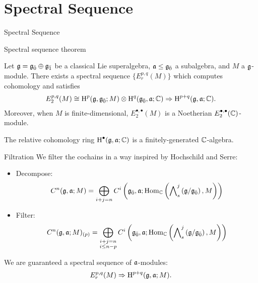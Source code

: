\documentclass{beamer}
\newcommand{\sectionframe}[1]{\begin{frame}\begin{center}{\Huge #1 }\end{center}\end{frame}}
\begin{document}
\section{Spectral Sequence}
\sectionframe{Spectral Sequence}

\begin{frame}{Spectral sequence theorem}\pause

  \begin{theorem}
    Let $\mathfrak{g} = {\mathfrak{g}}_{\bar{0}} \oplus {\mathfrak{g}}_{\bar{1}}$ be a classical Lie superalgebra, $\mathfrak{a} \leq {\mathfrak{g}}_{\bar{0}}$ a subalgebra, and $M$ a $\mathfrak{g}$-module. There exists a spectral sequence $\{E_r^{p,q}(M)\}$ which computes cohomology and satisfies
    \begin{align*}
      E_2^{p,q}(M) \cong \operatorname{H}^p(\mathfrak{g},{\mathfrak{g}}_{\bar{0}};M) \otimes \operatorname{H}^q({\mathfrak{g}}_{\bar{0}},\mathfrak{a};\mathbb{C}) \Rightarrow \operatorname{H}^{p+q}(\mathfrak{g},\mathfrak{a};\mathbb{C}).
    \end{align*}
    Moreover, when $M$ is finite-dimensional, $E_2^{\bullet,\bullet}(M)$ is a Noetherian $E_2^{\bullet,\bullet}(\mathbb{C})$-module.
  \end{theorem}
\pause
  \begin{corollary}
    The relative cohomology ring $\operatorname{H}^\bullet(\mathfrak{g},\mathfrak{a};\mathbb{C})$ is a finitely-generated $\mathbb{C}$-algebra.
  \end{corollary}
\end{frame}

\begin{frame}{Filtration}\pause
  We filter the cochains in a way inspired by Hochschild and Serre:\pause
  \begin{itemize}
  \item Decompose:
    \[
      C^n(\mathfrak{g},\mathfrak{a};M) = \bigoplus_{i + j = n} C^i\left({\mathfrak{g}}_{\bar{0}},\mathfrak{a};\operatorname{Hom}_{\mathbb{C}}\left( \bigwedge\nolimits^{j}_s\left(\mathfrak{g}/{\mathfrak{g}}_{\bar{0}}\right),M\right)\right)
    \]\pause
  \item Filter:
    \[
      C^n(\mathfrak{g},\mathfrak{a};M)_{(p)} = \bigoplus_{\substack{i + j = n\\ i \leq n-p}} C^i\left({\mathfrak{g}}_{\bar{0}},\mathfrak{a};\operatorname{Hom}_{\mathbb{C}}\left( \bigwedge\nolimits^{j}_s\left(\mathfrak{g}/{\mathfrak{g}}_{\bar{0}}\right),M\right)\right)
    \]
    
  \end{itemize}
\pause
  We are guaranteed a spectral sequence of $\mathfrak{a}$-modules:
  \[
    E_r^{p,q}(M) \Rightarrow \operatorname{H}^{p+q}(\mathfrak{g},\mathfrak{a};M).
  \]  
\end{frame}
\end{document}
